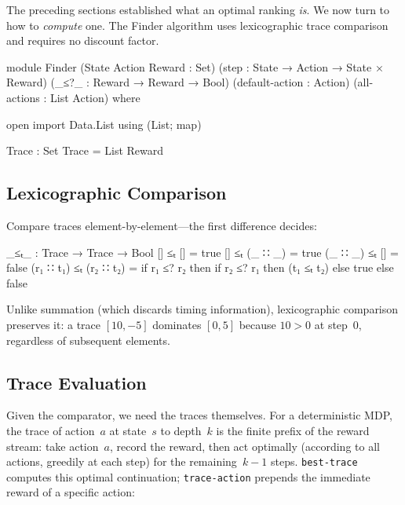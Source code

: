 \documentclass[runningheads]{llncs}
\begin{document}
The preceding sections established what an optimal ranking \emph{is}.  We now turn to how to \emph{compute} one.  The Finder algorithm uses lexicographic trace comparison and requires no discount factor.

\begin{code}[hide]
module Finder
  (State Action Reward : Set)
  (step                : State → Action → State × Reward)
  (_≤?_                : Reward → Reward → Bool)
  (default-action      : Action)
  (all-actions         : List Action)
  where

  open import Data.List using (List; map)

  Trace : Set
  Trace = List Reward
\end{code}

\subsection{Lexicographic Comparison}

Compare traces element-by-element---the first difference decides:

\begin{code}[hide]
  _≤ₜ_ : Trace → Trace → Bool
  []       ≤ₜ []       = true
  []       ≤ₜ (_ ∷ _)  = true
  (_ ∷ _)  ≤ₜ []       = false
  (r₁ ∷ t₁) ≤ₜ (r₂ ∷ t₂) =
    if r₁ ≤? r₂ then
      if r₂ ≤? r₁ then (t₁ ≤ₜ t₂)
      else true
    else false
\end{code}

\noindent Unlike summation (which discards timing information), lexicographic comparison preserves it: a trace $[10, -5]$ dominates $[0, 5]$ because $10 > 0$ at step~$0$, regardless of subsequent elements.

\subsection{Trace Evaluation}

Given the comparator, we need the traces themselves.  For a deterministic MDP, the trace of action~$a$ at state~$s$ to depth~$k$ is the finite prefix of the reward stream: take action~$a$, record the reward, then act optimally (according to all actions, greedily at each step) for the remaining~$k{-}1$ steps.  \texttt{best-trace} computes this optimal continuation; \texttt{trace-action} prepends the immediate reward of a specific action:
\end{document}
